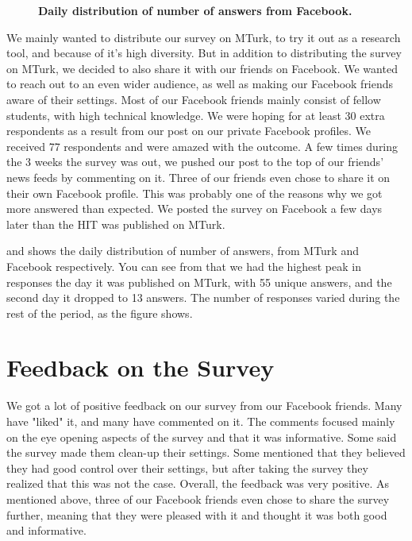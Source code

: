 \begin{figure}[t]
\centering
{}
\caption[Daily distribution of number of answers from Facebook]{\textbf{Daily distribution of number of answers from Facebook.}} 
\label{fig:answersfacebook}
\end{figure}

We mainly wanted to distribute our survey on MTurk, to try it out as a research tool, and because of it's high diversity. But in addition to distributing the survey on MTurk, we decided to also share it with our friends on Facebook. We wanted to reach out to an even wider audience, as well as making our Facebook friends aware of their settings. Most of our Facebook friends mainly consist of fellow students, with high technical knowledge. We were hoping for at least 30 extra respondents as a result from our post on our private Facebook profiles. We received 77 respondents and were amazed with the outcome. A few times during the 3 weeks the survey was out, we pushed our post to the top of our friends' news feeds by commenting on it. Three of our friends even chose to share it on their own Facebook profile. This was probably one of the reasons why we got more answered than expected. We posted the survey on Facebook a few days later than the HIT was published on MTurk.  

 and  shows the daily distribution of number of answers, from MTurk and Facebook respectively. You can see from  that we had the highest peak in responses the day it was published on MTurk, with 55 unique answers, and the second day it dropped to 13 answers. The number of responses varied during the rest of the period, as the figure shows. 

\section{Feedback on the Survey}
We got a lot of positive feedback on our survey from our Facebook friends. Many have "liked" it, and many have commented on it. The comments focused mainly on the eye opening aspects of the survey and that it was informative. Some said the survey made them clean-up their settings. Some mentioned that they believed they had good control over their settings, but after taking the survey they realized that this was not the case. Overall, the feedback was very positive. As mentioned above, three of our Facebook friends even chose to share the survey further, meaning that they were pleased with it and thought it was both good and informative. 

